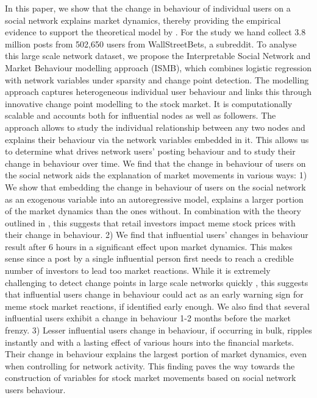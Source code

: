 In this paper, we show that the change in behaviour of individual users on a social network explains market dynamics, thereby providing the empirical evidence to support the theoretical model by \citet{Pedersen2022}. For the study we hand collect 3.8 million posts from 502,650 users from WallStreetBets, a subreddit. To analyse this large scale network dataset, we propose the Interpretable Social Network and Market Behaviour modelling approach (ISMB), which combines logistic regression with network variables under sparsity and change point detection. %
The modelling approach captures heterogeneous individual user behaviour and links this through innovative change point modelling to the stock market. It is computationally scalable and accounts both for influential nodes as well as followers. The approach allows to study the individual relationship between any two nodes and explains their behaviour via the network variables embedded in it. This allows us to determine what drives network users' posting behaviour and to study their change in behaviour over time. We find that the change in behaviour of users on the social network aids the explanation of market movements in various ways: 1) We show that embedding the change in behaviour of users on the social network as an exogenous variable into an autoregressive model, explains a larger portion of the market dynamics than the ones without. %
In combination with the theory outlined in \citet{Pedersen2022}, this suggests that retail investors impact meme stock prices with their change in behaviour. 2) We find that influential users' changes in behaviour result after 6 hours in a significant effect upon market dynamics. This makes sense since a post by a single influential person first needs to reach a credible number of investors to lead too market reactions. While it is extremely challenging to detect change points in large scale networks quickly \citep{zwetsloot2025online,Yu2022monitoring}, this suggests that influential users change in behaviour could act as an early warning sign for meme stock market reactions, if identified early enough. We also find that several influential users exhibit a change in behaviour 1-2 months before the market frenzy. 3) Lesser influential users change in behaviour, if occurring in bulk, ripples instantly and with a lasting effect of various hours into the financial markets. Their change in behaviour explains the largest portion of market dynamics, even when controlling for network activity. This finding paves the way towards the construction of variables for stock market movements based on social network users behaviour. 

